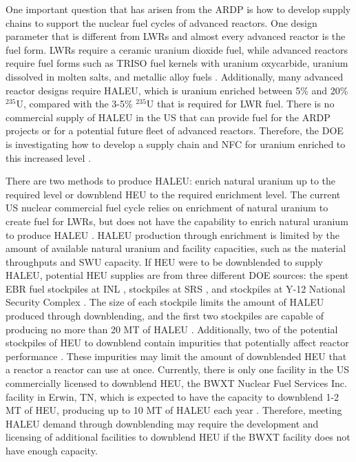 One important question that has arisen from the \gls{ARDP} is how to
develop supply chains to support the nuclear fuel cycles of 
advanced reactors. One design parameter that is different from \glspl{LWR} 
and almost every advanced reactor is the fuel form. \glspl{LWR} require 
a ceramic uranium dioxide fuel, while advanced reactors require fuel 
forms such as \gls{TRISO} fuel kernels with uranium oxycarbide, uranium 
dissolved in molten 
salts, and metallic alloy fuels \cite{hussain_advances_2018}.
Additionally, many advanced reactor designs require  
\acrfull{HALEU}, which is uranium enriched between 5\% and 20\% $^{235}$U,
compared with the 3-5\% $^{235}$U that is required for \gls{LWR} 
fuel. There is no commercial supply of \gls{HALEU} in the US that can 
provide fuel for the \gls{ARDP} projects or for a potential future fleet of 
advanced reactors. Therefore, the \gls{DOE} is investigating how to develop 
a supply chain and \gls{NFC} for uranium enriched to this 
increased level \cite{regalbuto_addressing_2020,dixon_estimated_2022}. 

There are two methods to produce \gls{HALEU}: enrich natural uranium up to 
the required level
or downblend \acrfull{HEU} to the required enrichment level. The current US
nuclear commercial fuel cycle relies on enrichment of natural uranium 
to create fuel for \glspl{LWR}, but does not have the capability to enrich
natural uranium to produce \gls{HALEU} \cite{nuclear_energy_institute_addressing_2018}.  
\gls{HALEU} production through enrichment is limited by
the amount of available natural uranium and facility capacities, such 
as the material throughputs and \acrfull{SWU} capacity.
If \gls{HEU} were to be
downblended to supply \gls{HALEU}, potential \gls{HEU} supplies are 
from three different 
\gls{DOE} sources: the spent \gls{EBR} fuel stockpiles at \gls{INL} 
\cite{patterson_haleu_2019}, stockpiles at \gls{SRS} \cite{regalbuto_addressing_2020}, 
and stockpiles at Y-12 National Security Complex 
\cite{robinson_establishment_2020}. The size of each stockpile limits the amount 
of \gls{HALEU} produced through downblending, and the first two stockpiles 
are capable of producing no more than 20 MT of \gls{HALEU}
\cite{regalbuto_addressing_2020}.
Additionally, two of the potential stockpiles of \gls{HEU} to downblend  
contain impurities that potentially affect reactor performance 
\cite{vaden_isotopic_2018,nelson_foreign_2010}.
These impurities may limit the amount of downblended \gls{HEU} that a reactor 
a reactor can use at once. 
Currently, there is only one facility in the US commercially licensed to 
downblend \gls{HEU}, the BWXT Nuclear Fuel Services Inc. facility in 
Erwin, TN, which is expected to have the capacity to downblend 1-2 
MT of \gls{HEU}, producing up to 10 MT of \gls{HALEU} each year \cite{nagley_ha-leu_2020}.
Therefore, meeting \gls{HALEU} demand through downblending may require the 
development and licensing of additional facilities to downblend \gls{HEU} if 
the BWXT facility does not have enough capacity. 

